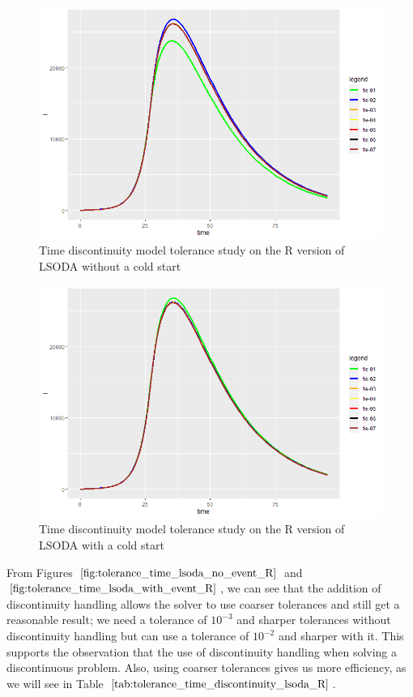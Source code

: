 \begin{figure}[H]
\centering
\includegraphics[width=0.7\linewidth]{./figures/tolerance_time_lsoda_no_event_R}
\caption{Time discontinuity model tolerance study on the R version of LSODA without a cold start}
\label{fig:tolerance_time_lsoda_no_event_R}
\end{figure}

\begin{figure}[H]
\centering
\includegraphics[width=0.7\linewidth]{./figures/tolerance_time_lsoda_with_event_R}
\caption{Time discontinuity model tolerance study on the R version of LSODA with a cold start}
\label{fig:tolerance_time_lsoda_with_event_R}
\end{figure}

From Figures $\ref{fig:tolerance_time_lsoda_no_event_R}$ and $\ref{fig:tolerance_time_lsoda_with_event_R}$, we can see that the addition of discontinuity handling allows the solver to use coarser tolerances and still get a reasonable result; we need a tolerance of $10^{-3}$ and sharper tolerances without discontinuity handling but can use a tolerance of $10^{-2}$ and sharper with it. This supports the observation that the use of discontinuity handling when solving a discontinuous problem. Also, using coarser tolerances gives us more efficiency, as we will see in Table $\ref{tab:tolerance_time_discontinuity_lsoda_R}$. 

